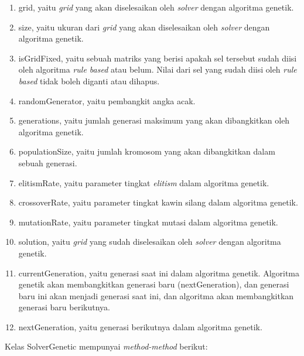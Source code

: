 \begin{enumerate}
\item grid, yaitu \textit{grid} yang akan diselesaikan oleh \textit{solver} dengan algoritma genetik.
\item size, yaitu ukuran dari \textit{grid} yang akan diselesaikan oleh \textit{solver} dengan algoritma genetik.
\item isGridFixed, yaitu sebuah matriks yang berisi apakah sel tersebut sudah diisi oleh algoritma \textit{rule based} atau belum. Nilai dari sel yang sudah diisi oleh \textit{rule based} tidak boleh diganti atau dihapus.
\item randomGenerator, yaitu pembangkit angka acak.
\item generations, yaitu jumlah generasi maksimum yang akan dibangkitkan oleh algoritma genetik.
\item populationSize, yaitu jumlah kromosom yang akan dibangkitkan dalam sebuah generasi.
\item elitismRate, yaitu parameter tingkat \textit{elitism} dalam algoritma genetik.
\item crossoverRate, yaitu parameter tingkat kawin silang dalam algoritma genetik.
\item mutationRate, yaitu parameter tingkat mutasi dalam algoritma genetik.
\item solution, yaitu \textit{grid} yang sudah diselesaikan oleh \textit{solver} dengan algoritma genetik.
\item currentGeneration, yaitu generasi saat ini dalam algoritma genetik. Algoritma genetik akan membangkitkan generasi baru (nextGeneration), dan generasi baru ini akan menjadi generasi saat ini, dan algoritma akan membangkitkan generasi baru berikutnya.
\item nextGeneration, yaitu generasi berikutnya dalam algoritma genetik.
\end{enumerate}

Kelas SolverGenetic mempunyai \textit{method-method} berikut:

